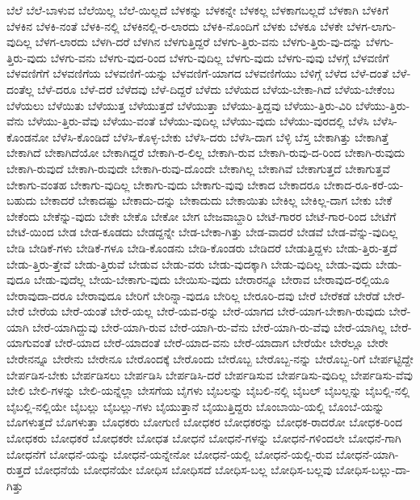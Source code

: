 {ಬೆಲೆ
ಬೆಲೆ-ಬಾಳುವ
ಬೆಲೆಯಿಲ್ಲ
ಬೆಲೆ-ಯಿಲ್ಲದೆ
ಬೆಳಕನ್ನು
ಬೆಳಕನ್ನೇ
ಬೆಳಕಲ್ಲ
ಬೆಳಕಾಗಬಲ್ಲದೆ
ಬೆಳಕಾಗಿ
ಬೆಳಕಿಗೆ
ಬೆಳಕಿನ
ಬೆಳಕಿ-ನಂತೆ
ಬೆಳಕಿ-ನಲ್ಲಿ
ಬೆಳಕಿನಲ್ಲಿ-ರ-ಲಾರದು
ಬೆಳಕಿ-ನೊಂದಿಗೆ
ಬೆಳಕು
ಬೆಳಕೂ
ಬೆಳಕೇ
ಬೆಳಗ-ಲಾಗು-ವುದಿಲ್ಲ
ಬೆಳಗ-ಲಾರದು
ಬೆಳಗಿ-ದರೆ
ಬೆಳಗಿನ
ಬೆಳಗುತ್ತಿದ್ದರೆ
ಬೆಳಗು-ತ್ತಿರು-ವನು
ಬೆಳಗು-ತ್ತಿರು-ವು-ದನ್ನು
ಬೆಳಗು-ತ್ತಿರು-ವುದು
ಬೆಳಗು-ವನು
ಬೆಳಗು-ವುದ-ರಿಂದ
ಬೆಳಗು-ವುದಿಲ್ಲ
ಬೆಳಗು-ವುದು
ಬೆಳಗು-ವುವು
ಬೆಳಗ್ಗೆ
ಬೆಳವಣಿಗೆ
ಬೆಳವಣಿಗೆಗೆ
ಬೆಳವಣಿಗೆಯ
ಬೆಳವಣಿಗೆ-ಯನ್ನು
ಬೆಳವಣಿಗೆ-ಯಾಗದ
ಬೆಳವಣಿಗೆಯು
ಬೆಳಿಗ್ಗೆ
ಬೆಳೆದ
ಬೆಳೆ-ದಂತೆ
ಬೆಳೆ-ದಂತೆಲ್ಲ
ಬೆಳೆ-ದರೂ
ಬೆಳೆ-ದರೆ
ಬೆಳೆದವು
ಬೆಳೆ-ದಿದ್ದರೆ
ಬೆಳೆದು
ಬೆಳೆಯದ
ಬೆಳೆಯ-ಬೇಕಾ-ಗಿದೆ
ಬೆಳೆಯ-ಬೇಕೆಂಬ
ಬೆಳೆಯಲು
ಬೆಳೆಯಿತು
ಬೆಳೆಯುತ್ತ
ಬೆಳೆಯುತ್ತದೆ
ಬೆಳೆಯುತ್ತಾ
ಬೆಳೆಯು-ತ್ತಿದ್ದವು
ಬೆಳೆಯು-ತ್ತಿರು-ವಿರಿ
ಬೆಳೆಯು-ತ್ತಿರು-ವೆನು
ಬೆಳೆಯು-ತ್ತಿರು-ವೆವು
ಬೆಳೆಯು-ವಂತೆ
ಬೆಳೆಯು-ವುದಿಲ್ಲ
ಬೆಳೆಯು-ವುದು
ಬೆಳೆಯು-ವುರದಲ್ಲಿ
ಬೆಳೆಸಿ
ಬೆಳೆಸಿ-ಕೊಂಡನೋ
ಬೆಳೆಸಿ-ಕೊಂಡಿದೆ
ಬೆಳೆಸಿ-ಕೊಳ್ಳ-ಬೇಕು
ಬೆಳೆಸಿ-ದರು
ಬೆಳೆಸಿ-ದಾಗ
ಬೆಳ್ಳಿ
ಬೆಸ್ತ
ಬೇಕಾಗಿತ್ತು
ಬೇಕಾಗಿತ್ತೆ
ಬೇಕಾಗಿದೆ
ಬೇಕಾಗಿದೆಯೋ
ಬೇಕಾಗಿದ್ದರೆ
ಬೇಕಾಗಿ-ರ-ಲಿಲ್ಲ
ಬೇಕಾಗಿ-ರುವ
ಬೇಕಾಗಿ-ರುವು-ದ-ರಿಂದ
ಬೇಕಾಗಿ-ರುವುದು
ಬೇಕಾಗಿ-ರುವುದೆ
ಬೇಕಾಗಿ-ರುವುದೇ
ಬೇಕಾಗಿ-ರುವು-ದೊಂದೇ
ಬೇಕಾಗಿಲ್ಲ
ಬೇಕಾಗಿವೆ
ಬೇಕಾಗುತ್ತದೆ
ಬೇಕಾಗುತ್ತವೆ
ಬೇಕಾಗು-ವಂತಹ
ಬೇಕಾಗು-ವುದಿಲ್ಲ
ಬೇಕಾಗು-ವುದು
ಬೇಕಾಗು-ವುವು
ಬೇಕಾದ
ಬೇಕಾದರೂ
ಬೇಕಾದ-ರೂ-ಕರೆ-ಯ-ಬಹುದು
ಬೇಕಾದರೆ
ಬೇಕಾದಷ್ಟು
ಬೇಕಾದು-ದನ್ನು
ಬೇಕಾದುದು
ಬೇಕಾಯಿತು
ಬೇಕಿಲ್ಲ
ಬೇಕಿಲ್ಲ-ದಾಗ
ಬೇಕು
ಬೇಕೆ
ಬೇಕೆಂದು
ಬೇಕೆನ್ನು-ವುದು
ಬೇಕೇ
ಬೇಕೊ
ಬೇಕೋ
ಬೇಗ
ಬೇಜವಾಬ್ದಾರಿ
ಬೇಟೆ-ಗಾರರ
ಬೇಟೆ-ಗಾರ-ರಿಂದ
ಬೇಟೆಗೆ
ಬೇಟೆ-ಯಿಂದ
ಬೇಡ
ಬೇಡ-ಕೂಡದು
ಬೇಡದ್ದನ್ನೇ
ಬೇಡ-ಬೇಕಾ-ಗಿತ್ತು
ಬೇಡ-ವಾದರೆ
ಬೇಡವೆ
ಬೇಡ-ವೆನ್ನು-ವುದಿಲ್ಲ
ಬೇಡಿ
ಬೇಡಿಕೆ-ಗಳು
ಬೇಡಿಕೆ-ಗಳೂ
ಬೇಡಿ-ಕೊಂಡನು
ಬೇಡಿ-ಕೊಂಡರು
ಬೇಡಿದರೆ
ಬೇಡುತ್ತಿದ್ದಳು
ಬೇಡು-ತ್ತಿರು-ತ್ತದೆ
ಬೇಡು-ತ್ತಿರು-ತ್ತೇವೆ
ಬೇಡು-ತ್ತಿರುವೆ
ಬೇಡುವ
ಬೇಡು-ವರು
ಬೇಡು-ವುದಕ್ಕಾಗಿ
ಬೇಡು-ವುದಿಲ್ಲ
ಬೇಡು-ವುದು
ಬೇಡು-ವುದೂ
ಬೇಡು-ವುದೆಲ್ಲ
ಬೇಯ-ಬೇಕಾಗು-ವುದು
ಬೇಯಿಸು-ವುದು
ಬೇರಾರನ್ನೂ
ಬೇರಾವ
ಬೇರಾವುದ-ರಲ್ಲಿಯೂ
ಬೇರಾವುದಾ-ದರೂ
ಬೇರಾವುದೂ
ಬೇರಿಗೆ
ಬೇರಿನ್ನಾ-ವುದೂ
ಬೇರಿಲ್ಲ
ಬೇರೂರಿ-ದವು
ಬೇರೆ
ಬೇರೆಕಡೆ
ಬೇರೆಡೆ
ಬೇರೆ-ಬೇರೆ
ಬೇರೆಯ
ಬೇರೆ-ಯಂತೆ
ಬೇರೆ-ಯಲ್ಲ
ಬೇರೆ-ಯವ-ರನ್ನು
ಬೇರೆ-ಯಾಗದ
ಬೇರೆ-ಯಾಗ-ಬೇಕಾಗಿ-ರುವುದು
ಬೇರೆ-ಯಾಗಿ
ಬೇರೆ-ಯಾಗಿದ್ದುವು
ಬೇರೆ-ಯಾಗಿ-ರುವ
ಬೇರೆ-ಯಾಗಿ-ರು-ವೆನು
ಬೇರೆ-ಯಾಗಿ-ರು-ವೆವು
ಬೇರೆ-ಯಾಗಿಲ್ಲ
ಬೇರೆ-ಯಾಗುವಂತೆ
ಬೇರೆ-ಯಾದ
ಬೇರೆ-ಯಾದಂತೆ
ಬೇರೆ-ಯಾದ-ವನು
ಬೇರೆ-ಯಾದಾಗ
ಬೇರೆಯೇ
ಬೇರೆಲ್ಲೂ
ಬೇರೇ
ಬೇರೇನನ್ನೂ
ಬೇರೇನು
ಬೇರೇನೂ
ಬೇರೊಂದಕ್ಕೆ
ಬೇರೊಂದು
ಬೇರೊಬ್ಬ
ಬೇರೊಬ್ಬ-ನನ್ನು
ಬೇರೊಬ್ಬ-ರಿಗೆ
ಬೇರ್ಪಟ್ಟಿದ್ದೇ
ಬೇರ್ಪಡಿಸ-ಬೇಕು
ಬೇರ್ಪಡಿಸಲು
ಬೇರ್ಪಡಿಸಿ
ಬೇರ್ಪಡಿಸಿ-ದರೆ
ಬೇರ್ಪಡಿಸುವ
ಬೇರ್ಪಡಿಸು-ವುದಿಲ್ಲ
ಬೇರ್ಪಡಿಸು-ವೆವು
ಬೇಲಿ
ಬೇಲಿ-ಗಳನ್ನು
ಬೇಲಿ-ಯನ್ನೆಲ್ಲಾ
ಬೇಸಗೆಯ
ಬೈಗಳು
ಬೈಬಲನ್ನು
ಬೈಬಲಿ-ನಲ್ಲಿ
ಬೈಬಲ್
ಬೈಬಲ್ಲನ್ನು
ಬೈಬಲ್ಲಿ-ನಲ್ಲಿ
ಬೈಬಲ್ಲಿ-ನಲ್ಲಿಯೇ
ಬೈಬಲ್ಲು
ಬೈಬಲ್ಲು-ಗಳು
ಬೈಯುತ್ತಾನೆ
ಬೈಯುತ್ತಿದ್ದರು
ಬೊಂಬಾಯಿ-ಯಲ್ಲಿ
ಬೊಂಬೆ-ಯನ್ನು
ಬೊಗಳುತ್ತದೆ
ಬೊಗಳುತ್ತಾ
ಬೊಧಕರು
ಬೋಗುಣಿ
ಬೋಧಕರ
ಬೋಧಕರನ್ನು
ಬೋಧಕ-ರಾದರೋ
ಬೋಧಕ-ರಿಂದ
ಬೋಧಕರು
ಬೋಧಕರೆ
ಬೋಧಕರೇ
ಬೋಧತ
ಬೋಧನೆ
ಬೋಧನೆ-ಗಳನ್ನು
ಬೋಧನೆ-ಗಳಿಂದಲೇ
ಬೋಧನೆ-ಗಾಗಿ
ಬೋಧನೆಗೆ
ಬೋಧನೆ-ಯನ್ನು
ಬೋಧನೆ-ಯನ್ನೇನೋ
ಬೋಧನೆ-ಯಲ್ಲಿ
ಬೋಧನೆ-ಯಲ್ಲಿ-ರುವ
ಬೋಧನೆ-ಯಾಗಿ-ರುತ್ತದೆ
ಬೋಧನೆಯೆ
ಬೋಧನೆಯೇ
ಬೋಧಿಸ
ಬೋಧಿಸದೆ
ಬೋಧಿಸ-ಬಲ್ಲ
ಬೋಧಿಸ-ಬಲ್ಲವು
ಬೋಧಿಸ-ಬಲ್ಲು-ದಾ-ಗಿತ್ತು
}
